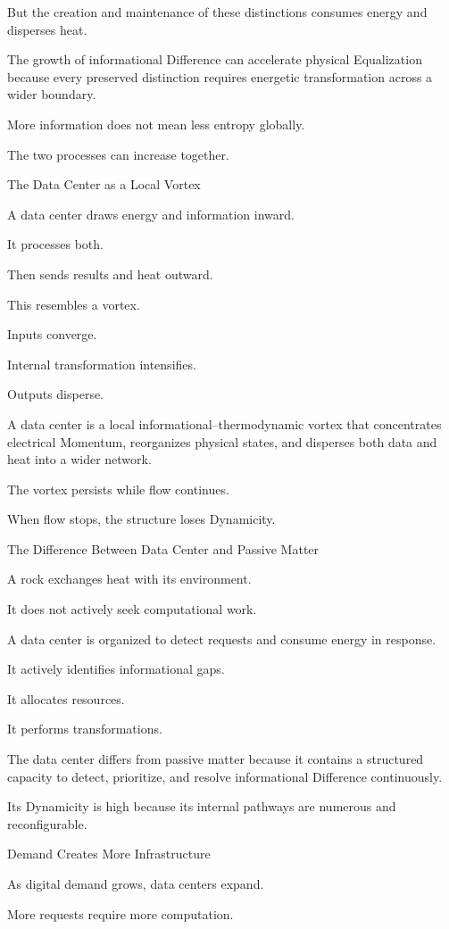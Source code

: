 But the creation and maintenance of these distinctions consumes energy and disperses heat.

The growth of informational Difference can accelerate physical Equalization because every preserved distinction requires energetic transformation across a wider boundary.

More information does not mean less entropy globally.

The two processes can increase together.

The Data Center as a Local Vortex

A data center draws energy and information inward.

It processes both.

Then sends results and heat outward.

This resembles a vortex.

Inputs converge.

Internal transformation intensifies.

Outputs disperse.

A data center is a local informational–thermodynamic vortex that concentrates electrical Momentum, reorganizes physical states, and disperses both data and heat into a wider network.

The vortex persists while flow continues.

When flow stops, the structure loses Dynamicity.

The Difference Between Data Center and Passive Matter

A rock exchanges heat with its environment.

It does not actively seek computational work.

A data center is organized to detect requests and consume energy in response.

It actively identifies informational gaps.

It allocates resources.

It performs transformations.

The data center differs from passive matter because it contains a structured capacity to detect, prioritize, and resolve informational Difference continuously.

Its Dynamicity is high because its internal pathways are numerous and reconfigurable.

Demand Creates More Infrastructure

As digital demand grows, data centers expand.

More requests require more computation.

